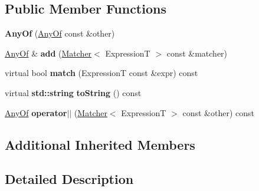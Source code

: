 \subsection*{Public Member Functions}
\begin{DoxyCompactItemize}
\item 
\mbox{\label{class_catch_1_1_matchers_1_1_impl_1_1_generic_1_1_any_of_a74fbc05b32d334fcbfd0fae0163a404e}} 
{\bfseries Any\+Of} (\hyperlink{class_catch_1_1_matchers_1_1_impl_1_1_generic_1_1_any_of}{Any\+Of} const \&other)
\item 
\mbox{\label{class_catch_1_1_matchers_1_1_impl_1_1_generic_1_1_any_of_a3bce94b627551e5f96c5f9c6060413f0}} 
\hyperlink{class_catch_1_1_matchers_1_1_impl_1_1_generic_1_1_any_of}{Any\+Of} \& {\bfseries add} (\hyperlink{struct_catch_1_1_matchers_1_1_impl_1_1_matcher}{Matcher}$<$ ExpressionT $>$ const \&matcher)
\item 
\mbox{\label{class_catch_1_1_matchers_1_1_impl_1_1_generic_1_1_any_of_adebd5437cdb8e0d54e16e97fe26e7e85}} 
virtual bool {\bfseries match} (ExpressionT const \&expr) const
\item 
\mbox{\label{class_catch_1_1_matchers_1_1_impl_1_1_generic_1_1_any_of_a331aaf012b133682eadc9ed5342f848a}} 
virtual \textbf{ std\+::string} {\bfseries to\+String} () const
\item 
\mbox{\label{class_catch_1_1_matchers_1_1_impl_1_1_generic_1_1_any_of_a6dc9aee9a816f66ddc9de0c45c1c9ac1}} 
\hyperlink{class_catch_1_1_matchers_1_1_impl_1_1_generic_1_1_any_of}{Any\+Of} {\bfseries operator$\vert$$\vert$} (\hyperlink{struct_catch_1_1_matchers_1_1_impl_1_1_matcher}{Matcher}$<$ ExpressionT $>$ const \&other) const
\end{DoxyCompactItemize}
\subsection*{Additional Inherited Members}


\subsection{Detailed Description}
